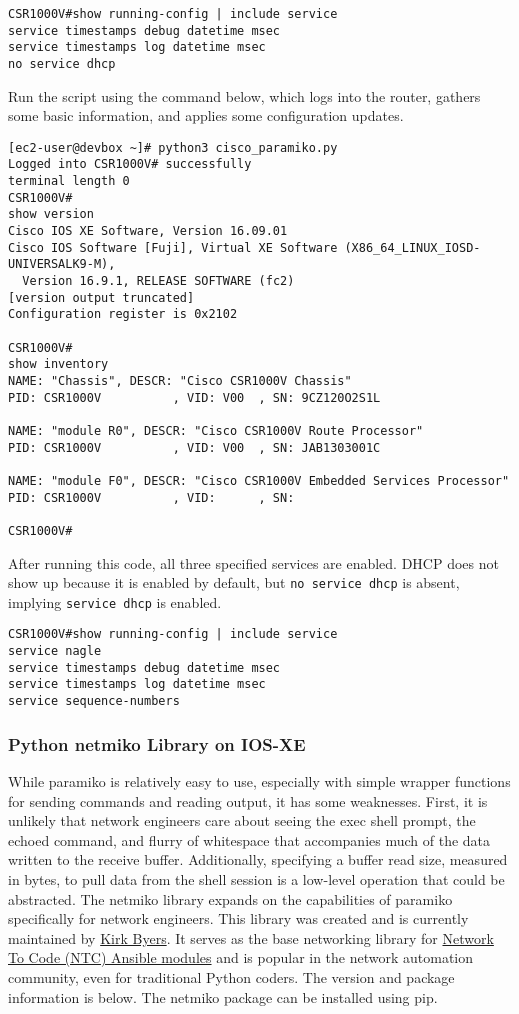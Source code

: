 \begin{verbatim}
CSR1000V#show running-config | include service
service timestamps debug datetime msec
service timestamps log datetime msec
no service dhcp
\end{verbatim}

Run the script using the command below, which logs into the router, gathers
some basic information, and applies some configuration updates.

\begin{verbatim}
[ec2-user@devbox ~]# python3 cisco_paramiko.py
Logged into CSR1000V# successfully
terminal length 0
CSR1000V#
show version
Cisco IOS XE Software, Version 16.09.01
Cisco IOS Software [Fuji], Virtual XE Software (X86_64_LINUX_IOSD-UNIVERSALK9-M),
  Version 16.9.1, RELEASE SOFTWARE (fc2)
[version output truncated]
Configuration register is 0x2102

CSR1000V#
show inventory
NAME: "Chassis", DESCR: "Cisco CSR1000V Chassis"
PID: CSR1000V          , VID: V00  , SN: 9CZ120O2S1L

NAME: "module R0", DESCR: "Cisco CSR1000V Route Processor"
PID: CSR1000V          , VID: V00  , SN: JAB1303001C

NAME: "module F0", DESCR: "Cisco CSR1000V Embedded Services Processor"
PID: CSR1000V          , VID:      , SN:

CSR1000V#
\end{verbatim}

After running this code, all three specified services are enabled. DHCP does
not show up because it is enabled by default, but \verb|no service dhcp| is
absent, implying \verb|service dhcp| is enabled.
 
\begin{verbatim}
CSR1000V#show running-config | include service
service nagle
service timestamps debug datetime msec
service timestamps log datetime msec
service sequence-numbers
\end{verbatim}

\subsubsection{Python netmiko Library on IOS-XE}
While paramiko is relatively easy to use, especially with simple wrapper
functions for sending commands and reading output, it has some weaknesses.
First, it is unlikely that network engineers care about seeing the exec shell
prompt, the echoed command, and flurry of whitespace that accompanies much of
the data written to the receive buffer. Additionally, specifying a buffer read
size, measured in bytes, to pull data from the shell session is a low-level
operation that could be abstracted. The netmiko library expands on the
capabilities of paramiko specifically for network engineers. This library was
created and is currently maintained by
\href{https://pynet.twb-tech.com/blog/automation/netmiko.html}{Kirk Byers}.
It serves as the base networking library for
\href{https://github.com/networktocode/ntc-ansible}{Network To Code (NTC) Ansible modules}
and is popular in the network automation community, even for traditional Python
coders. The version and package information is below. The netmiko package can
be installed using pip.

